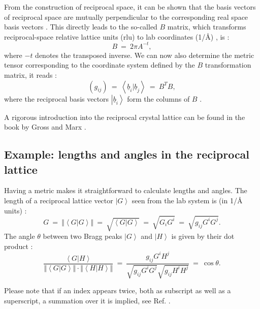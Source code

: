 From the construction of reciprocal space, it can be shown that the basis vectors of reciprocal space
are mutually perpendicular to the corresponding real space basis vectors \cite[p. 60]{Gross2012}.
This directly leads to the so-called $B$ matrix, which transforms reciprocal-space relative lattice units (rlu)
to lab coordinates (1/\AA) \cite{Lumsden2005}, is \cite[p. 60]{Gross2012}:
\begin{equation} B \ =\  2 \pi A^{-t}, \end{equation}
where $-t$ denotes the transposed inverse.
We can now also determine the metric tensor \cite[pp. 807-809]{Arens2015} corresponding to the coordinate
system defined by the $B$ transformation matrix, it reads \cite[p. 808]{Arens2015}:
\begin{equation}
	\left(g_{ij}\right) \ =\  \left<\underline{b}_i | \underline{b}_j \right> \ =\  B^T B,
\end{equation}
where the reciprocal basis vectors $\left| \underline{b}_i \right>$ form the columns of $B$ \cite[p. 631]{Arens2015}.

A rigorous introduction into the reciprocal crystal lattice can be found in the book by Gross
and Marx \cite[pp. 58 - 67]{Gross2012}.


\subsection{Example: lengths and angles in the reciprocal lattice}
Having a metric makes it straightforward to calculate lengths and angles.
The length of a reciprocal lattice vector $\left| G \right>$ seen from the lab system is 
(in 1/\AA{} units) \cite[p. 808]{Arens2015}:
\begin{equation}
	G  \ =\ 
	\left\Vert \left< G | G \right> \right\Vert \ =\  \sqrt{\left< G | G \right>}
		\ =\  \sqrt{G_i G^i} \ =\  \sqrt{g_{ij} G^i G^j}.
\end{equation}
The angle $\theta$ between two Bragg peaks $\left| G \right>$ and $\left| H \right>$ 
is given by their dot product \cite[p. 808]{Arens2015}:
\begin{equation}
	\frac{\left< G | H \right>}{\left\Vert \left< G | G \right> \right\Vert
		\cdot \left\Vert \left< H | H \right> \right\Vert} \ =\
	\frac{g_{ij} G^i H^j }{\sqrt{g_{ij} G^i G^j} \sqrt{g_{ij} H^i H^j}} \ =\  \cos \theta.
\end{equation}

Please note that if an index appears twice, both as subscript as well as a superscript, 
a summation over it is implied, see Ref. \cite{wiki_summation}.



